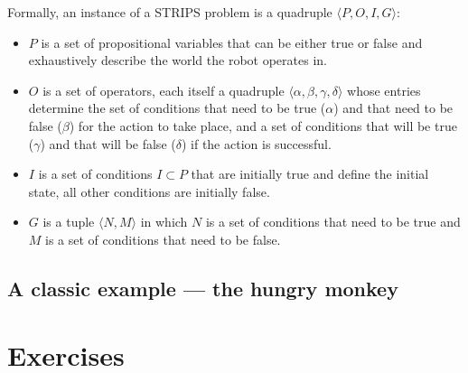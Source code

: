 Formally, an instance of a STRIPS problem is a quadruple $\langle P, O, I, G \rangle$:
\begin{itemize}
\item $P$ is a set of propositional variables that can be either true or false and exhaustively describe the world the robot operates in.
\item $O$ is a set of operators, each itself a quadruple $\langle \alpha, \beta, \gamma, \delta \rangle$ whose entries determine the set of conditions that need to be true ($\alpha$) and that need to be false ($\beta$) for the action to take place, and a set of conditions that will be true ($\gamma$) and that will be false ($\delta$) if the action is successful.
\item $I$ is a set of conditions $I \subset P$ that are initially true and define the initial state, all other conditions are initially false.
\item $G$ is a tuple $\langle N, M\rangle$ in which $N$ is a set of conditions that need to be true and $M$ is a set of conditions that need to be false.
\end{itemize}

\subsection{A classic example --- the hungry monkey}




\section{Exercises}

